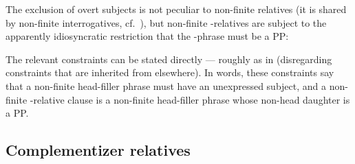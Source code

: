 \documentclass[output=paper
 	        ,biblatex
                ,babelshorthands
                ,newtxmath
                ,draftmode
                ,colorlinks, citecolor=brown
]{langscibook}
\begin{document}
The exclusion of overt subjects is not peculiar to non-finite relatives (it is shared by
non-finite interrogatives, cf.\ ), but non-finite -relatives are subject to the apparently
idiosyncratic restriction that the -phrase must be a PP:
\begin{exe}\ex\begin{xlist}
\end{xlist}\end{exe}
The relevant constraints can be stated directly --- roughly as in 
(disregarding constraints that are inherited from elsewhere). In words, these constraints say that a non-finite
head-filler phrase must have an unexpressed subject, and a non-finite -relative
clause is a non-finite head-filler phrase whose non-head daughter is a PP.
\begin{exe}\ex\begin{xlist}\label{x:rc-55}
  \ex {}
 \ex\label{x:rc-56}
 \end{xlist}
\end{exe}

\subsection{Complementizer relatives}
\label{sec:rc-comp-relatives}
\end{document}
